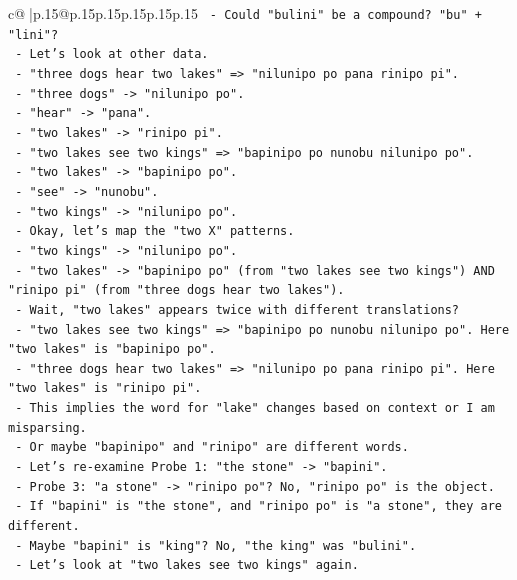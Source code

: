 \documentclass{article}
\begin{document}
{\begin{supertabular}{c@{$\;$}|p{.15\linewidth}@{}p{.15\linewidth}p{.15\linewidth}p{.15\linewidth}p{.15\linewidth}p{.15\linewidth}}
{{{\texttt{     {-} Could "bulini" be a compound? "bu" + "lini"?} \\
\texttt{     {-} Let's look at other data.} \\
\texttt{     {-} "three dogs hear two lakes" => "nilunipo po pana rinipo pi".} \\
\texttt{       {-} "three dogs" {-}> "nilunipo po".} \\
\texttt{       {-} "hear" {-}> "pana".} \\
\texttt{       {-} "two lakes" {-}> "rinipo pi".} \\
\texttt{     {-} "two lakes see two kings" => "bapinipo po nunobu nilunipo po".} \\
\texttt{       {-} "two lakes" {-}> "bapinipo po".} \\
\texttt{       {-} "see" {-}> "nunobu".} \\
\texttt{       {-} "two kings" {-}> "nilunipo po".} \\
\texttt{     {-} Okay, let's map the "two X" patterns.} \\
\texttt{       {-} "two kings" {-}> "nilunipo po".} \\
\texttt{       {-} "two lakes" {-}> "bapinipo po" (from "two lakes see two kings") AND "rinipo pi" (from "three dogs hear two lakes").} \\
\texttt{       {-} Wait, "two lakes" appears twice with different translations?} \\
\texttt{         {-} "two lakes see two kings" => "bapinipo po nunobu nilunipo po". Here "two lakes" is "bapinipo po".} \\
\texttt{         {-} "three dogs hear two lakes" => "nilunipo po pana rinipo pi". Here "two lakes" is "rinipo pi".} \\
\texttt{       {-} This implies the word for "lake" changes based on context or I am misparsing.} \\
\texttt{       {-} Or maybe "bapinipo" and "rinipo" are different words.} \\
\texttt{       {-} Let's re{-}examine Probe 1: "the stone" {-}> "bapini".} \\
\texttt{       {-} Probe 3: "a stone" {-}> "rinipo po"? No, "rinipo po" is the object.} \\
\texttt{       {-} If "bapini" is "the stone", and "rinipo po" is "a stone", they are different.} \\
\texttt{       {-} Maybe "bapini" is "king"? No, "the king" was "bulini".} \\
\texttt{       {-} Let's look at "two lakes see two kings" again.} \\
}}}
\end{supertabular}}
\end{document}
